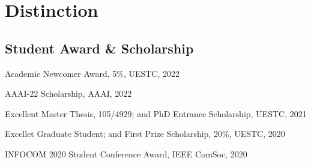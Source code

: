 \section*{Distinction}


\subsection*{\hspace{1.6em}Student Award \& Scholarship}
\indent

Academic Newcomer Award, 5\%, UESTC, 2022

AAAI-22 Scholarship, AAAI, 2022

Excellent Master Thesis, 105/4929; and PhD Entrance Scholarship, UESTC, 2021

Excellet Graduate Student; and First Prize Scholarship, 20\%, UESTC, 2020


INFOCOM 2020 Student Conference Award, IEEE ComSoc, 2020

